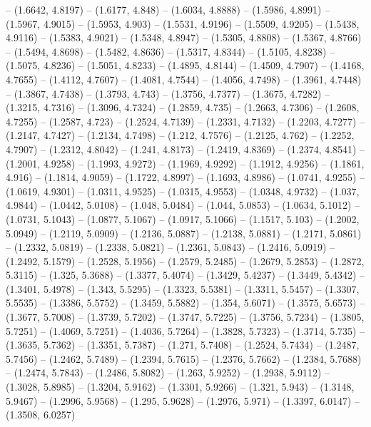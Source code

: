 {  -- (1.6642, 4.8197) -- (1.6177, 4.848) -- (1.6034, 4.8888) -- (1.5986, 4.8991)
   -- (1.5967, 4.9015) -- (1.5953, 4.903) -- (1.5531, 4.9196) -- (1.5509, 
  4.9205) -- (1.5438, 4.9116) -- (1.5383, 4.9021) -- (1.5348, 4.8947) -- 
  (1.5305, 4.8808) -- (1.5367, 4.8766) -- (1.5494, 4.8698) -- (1.5482, 4.8636) 
  -- (1.5317, 4.8344) -- (1.5105, 4.8238) -- (1.5075, 4.8236) -- (1.5051, 
  4.8233) -- (1.4895, 4.8144) -- (1.4509, 4.7907) -- (1.4168, 4.7655) -- 
  (1.4112, 4.7607) -- (1.4081, 4.7544) -- (1.4056, 4.7498) -- (1.3961, 4.7448) 
  -- (1.3867, 4.7438) -- (1.3793, 4.743) -- (1.3756, 4.7377) -- (1.3675, 4.7282)
   -- (1.3215, 4.7316) -- (1.3096, 4.7324) -- (1.2859, 4.735) -- (1.2663, 
  4.7306) -- (1.2608, 4.7255) -- (1.2587, 4.723) -- (1.2524, 4.7139) -- (1.2331,
   4.7132) -- (1.2203, 4.7277) -- (1.2147, 4.7427) -- (1.2134, 4.7498) -- 
  (1.212, 4.7576) -- (1.2125, 4.762) -- (1.2252, 4.7907) -- (1.2312, 4.8042) -- 
  (1.241, 4.8173) -- (1.2419, 4.8369) -- (1.2374, 4.8541) -- (1.2001, 4.9258) --
   (1.1993, 4.9272) -- (1.1969, 4.9292) -- (1.1912, 4.9256) -- (1.1861, 4.916) 
  -- (1.1814, 4.9059) -- (1.1722, 4.8997) -- (1.1693, 4.8986) -- (1.0741, 
  4.9255) -- (1.0619, 4.9301) -- (1.0311, 4.9525) -- (1.0315, 4.9553) -- 
  (1.0348, 4.9732) -- (1.037, 4.9844) -- (1.0442, 5.0108) -- (1.048, 5.0484) -- 
  (1.044, 5.0853) -- (1.0634, 5.1012) -- (1.0731, 5.1043) -- (1.0877, 5.1067) --
   (1.0917, 5.1066) -- (1.1517, 5.103) -- (1.2002, 5.0949) -- (1.2119, 5.0909) 
  -- (1.2136, 5.0887) -- (1.2138, 5.0881) -- (1.2171, 5.0861) -- (1.2332, 
  5.0819) -- (1.2338, 5.0821) -- (1.2361, 5.0843) -- (1.2416, 5.0919) -- 
  (1.2492, 5.1579) -- (1.2528, 5.1956) -- (1.2579, 5.2485) -- (1.2679, 5.2853) 
  -- (1.2872, 5.3115) -- (1.325, 5.3688) -- (1.3377, 5.4074) -- (1.3429, 5.4237)
   -- (1.3449, 5.4342) -- (1.3401, 5.4978) -- (1.343, 5.5295) -- (1.3323, 
  5.5381) -- (1.3311, 5.5457) -- (1.3307, 5.5535) -- (1.3386, 5.5752) -- 
  (1.3459, 5.5882) -- (1.354, 5.6071) -- (1.3575, 5.6573) -- (1.3677, 5.7008) --
   (1.3739, 5.7202) -- (1.3747, 5.7225) -- (1.3756, 5.7234) -- (1.3805, 5.7251) 
  -- (1.4069, 5.7251) -- (1.4036, 5.7264) -- (1.3828, 5.7323) -- (1.3714, 5.735)
   -- (1.3635, 5.7362) -- (1.3351, 5.7387) -- (1.271, 5.7408) -- (1.2524, 
  5.7434) -- (1.2487, 5.7456) -- (1.2462, 5.7489) -- (1.2394, 5.7615) -- 
  (1.2376, 5.7662) -- (1.2384, 5.7688) -- (1.2474, 5.7843) -- (1.2486, 5.8082) 
  -- (1.263, 5.9252) -- (1.2938, 5.9112) -- (1.3028, 5.8985) -- (1.3204, 5.9162)
   -- (1.3301, 5.9266) -- (1.321, 5.943) -- (1.3148, 5.9467) -- (1.2996, 5.9568)
   -- (1.295, 5.9628) -- (1.2976, 5.971) -- (1.3397, 6.0147) -- (1.3508, 6.0257)
}
